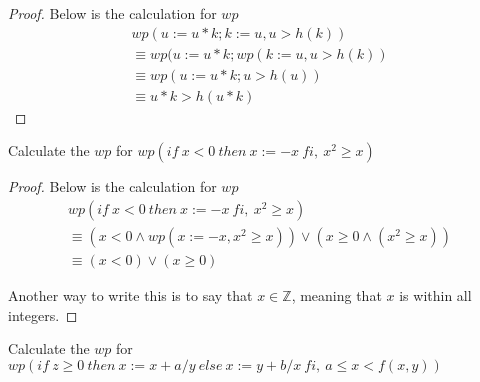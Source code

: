 \documentclass[12pt]{article}
\newenvironment{exercise}[2][Exercise]{\begin{trivlist}
\item[\hskip \labelsep {\bfseries #1}\hskip \labelsep {\bfseries #2.}]}{\end{trivlist}}
\begin{document}
\begin{proof}
Below is the calculation for $wp$
\begin{gather*}
    wp(u := u*k; k := u, u > h(k)) \\
    \equiv wp(u := u*k; wp(k := u, u > h(k)) \\ 
    \equiv wp(u := u*k; u > h(u)) \\ 
    \equiv u*k > h(u*k)
\end{gather*}

\end{proof}
 \newpage 
\begin{exercise}{4}
Calculate the $wp$ for $wp(if\: x < 0\: then\: x:= -x\: fi,\: x^{2} \geq x)$
\end{exercise}

\begin{proof}
Below is the calculation for $wp$ 
\begin{gather*}
    wp(if\: x < 0\: then\: x:= -x\: fi,\: x^{2} \geq x) \\ 
    \equiv (x < 0 \land wp(x := -x, x^{2} \geq x)) \lor ( x \geq 0 \land (x^{2} \geq x)) \\ 
    \equiv (x < 0) \lor (x \geq 0) 
\end{gather*}

Another way to write this is to say that $x \in \mathbb{Z}$, meaning that $x$ is within all integers. 

\end{proof}

\begin{exercise}{5}
Calculate the $wp$ for $wp(if\: z \geq 0\: then\: x:= x + a/y\: else\: x:= y + b/x\: fi,\: a \leq x < f(x,y))$
\end{exercise}
\end{document}

